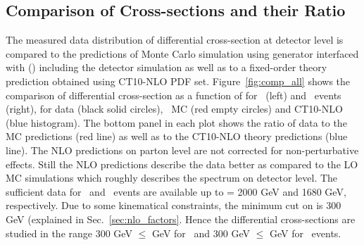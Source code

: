\subsection{Comparison of Cross-sections and their Ratio}
The measured data distribution of differential cross-section at detector level is compared to the predictions of Monte Carlo simulation using \MadGraphF generator interfaced with \PYTHIAS (\MGP) including the detector simulation as well as to a fixed-order theory prediction obtained using CT10-NLO PDF set. Figure~\ref{fig:comp_all} shows the comparison of differential cross-section as a function of \httwo for \njt~(left) and \njth~events (right), for data (black solid circles), \MGP~MC (red empty circles) and CT10-NLO (blue histogram). The bottom panel in each plot shows the ratio of data to the MC predictions (red line) as well as to the CT10-NLO theory predictions (blue line). The NLO predictions on parton level are not corrected for non-perturbative effects. Still the NLO predictions describe the data better as compared to the LO MC simulations which roughly describes the spectrum on detector level. The sufficient data for \njt~and \njth~events are available up to \httwo = 2000 GeV and 1680 GeV, respectively. Due to some kinematical constraints, the minimum cut on \httwo is 300 GeV  (explained in Sec.~\ref{sec:nlo_factors}. Hence the differential cross-sections are studied in the range 300 GeV $\leq$ \httwo {} GeV for \njt~and 300 GeV $\leq$ \httwo {} GeV for \njth~events.

